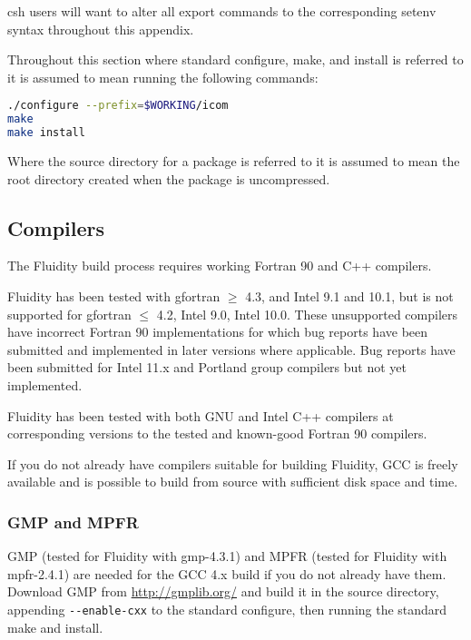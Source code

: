 csh users will want to alter all export commands to the corresponding setenv
syntax throughout this appendix.

Throughout this section where standard configure, make, and install is referred
to it is assumed to mean running the following commands:

\begin{lstlisting}[language=bash]
./configure --prefix=$WORKING/icom
make
make install
\end{lstlisting}

Where the source directory for a package is referred to it is assumed to mean
the root directory created when the package is uncompressed.

\subsection{Compilers}
\label{sec:required_libraries_compilers}

The Fluidity build process requires working Fortran 90 and C++ compilers.

Fluidity has been tested with gfortran $\geq$ 4.3, and Intel 9.1 and 10.1, but
is not supported for gfortran $\leq$ 4.2, Intel 9.0, Intel 10.0. These
unsupported compilers have incorrect Fortran 90 implementations for which bug
reports have been submitted and implemented in later versions where applicable.
Bug reports have been submitted for Intel 11.x and Portland group compilers but
not yet implemented.

Fluidity has been tested with both GNU and Intel C++ compilers at corresponding
versions to the tested and known-good Fortran 90 compilers.

If you do not already have compilers suitable for building Fluidity, GCC is
freely available and is possible to build from source with sufficient disk
space and time.

\subsubsection{GMP and MPFR}
\label{sec:required_libraries_compilers_gmp_mpfr}

GMP (tested for Fluidity with gmp-4.3.1) and MPFR (tested for Fluidity with
mpfr-2.4.1) are needed for the GCC 4.x build if you do not already have them.
Download GMP from \url{http://gmplib.org/} and build it in the source
directory, appending \lstinline[language=bash]+--enable-cxx+ to the standard
configure, then running the standard make and install.

